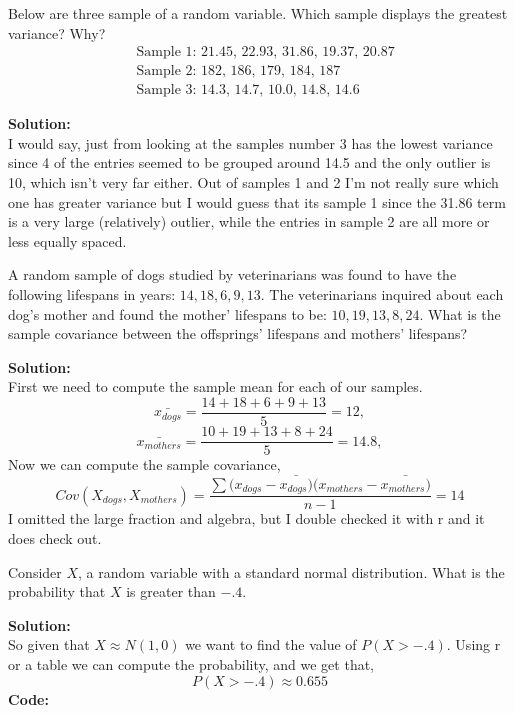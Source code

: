 \documentclass[12pt]{article}
\makeatletter
\theoremstyle{homework}
\newenvironment{exercise}[1]
{\def\@currentlabel{#1}\exercisecore}
{\endexercisecore}
\newcommand{\localhead}[1]{\par\smallskip\noindent\textbf{#1}\nobreak\\}%
\newcommand\solution{\localhead{Solution:}}
\makeatother
\begin{document}
\begin{exercise}{1} Below are three sample of a random variable. Which sample displays the 
    greatest variance? Why?
    \begin{align*}
        &\text{Sample 1: 21.45, 22.93, 31.86, 19.37, 20.87}\\
        &\text{Sample 2: 182, 186, 179, 184, 187}\\
        &\text{Sample 3: 14.3, 14.7, 10.0, 14.8, 14.6}
    \end{align*}

    \solution I would say, just from looking at the samples number 3 has the lowest variance since 4 of the 
    entries seemed to be grouped around 14.5 and the only outlier is 10, which isn't very far either. Out of samples
    1 and 2 I'm not really sure which one has greater variance but I would guess that its sample 1 since the 31.86 term 
    is a very large (relatively) outlier, while the entries in sample 2 are all more or less equally spaced. 
\end{exercise}
\newpage

\begin{exercise}{2} A random sample of dogs studied by veterinarians was found to have 
    the following lifespans in years: ${14,18, 6,9,13}$. The veterinarians inquired about each
    dog's mother and found the mother' lifespans to be: ${10, 19, 13,8,24}$. What is the sample covariance
    between the offsprings' lifespans and mothers' lifespans?\\
    \solution 
    First we need to compute the sample mean for each of our samples. 
    \begin{equation*}
        \bar{x_{dogs}} = \dfrac{14+18+6+9+13}{5} = 12,
    \end{equation*}
    \begin{equation*}
        \bar{x_{mothers}} = \dfrac{10+19+13+8+24}{5} = 14.8,
    \end{equation*}
    Now we can compute the sample covariance,
    \begin{equation*}
        Cov(X_{dogs},X_{mothers}) = \dfrac{\sum(x_{dogs}-\bar{x_{dogs})}(x_{mothers}-\bar{x_{mothers})}}{n-1} = 14
    \end{equation*}
I omitted the large fraction and algebra, but I double checked it with r and it does check out. 
\end{exercise}
\newpage

\begin{exercise}{3} Consider $X$, a random variable with a standard normal distribution. 
    What is the probability that $X$ is greater than $-.4$.\\
    \solution So given that $X \approx N(1,0)$ we want to find the value of $P(X>-.4)$. Using r or a table we 
    can compute the probability, and we get that, 
    \begin{equation*}
        P(X>-.4)\approx 0.655
    \end{equation*}
    \textbf{Code:}
		\begin{center}
			
		\end{center}
\end{exercise}
\end{document}
